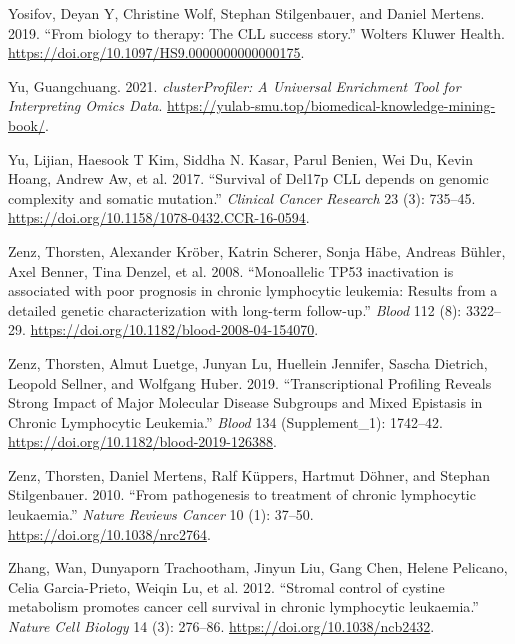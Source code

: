 \documentclass[11pt, a4paper, twosided]{book}
\newenvironment{CSLReferences}%
  {}%
  {\par}
\begin{document}
\begin{CSLReferences}{1}{0}
\leavevmode{}%
Yosifov, Deyan Y, Christine Wolf, Stephan Stilgenbauer, and Daniel Mertens. 2019. {``{From biology to therapy: The CLL success story}.''} Wolters Kluwer Health. \url{https://doi.org/10.1097/HS9.0000000000000175}.

\leavevmode{}%
Yu, Guangchuang. 2021. \emph{clusterProfiler: A Universal Enrichment Tool for Interpreting Omics Data}. \url{https://yulab-smu.top/biomedical-knowledge-mining-book/}.

\leavevmode{}%
Yu, Lijian, Haesook T Kim, Siddha N. Kasar, Parul Benien, Wei Du, Kevin Hoang, Andrew Aw, et al. 2017. {``{Survival of Del17p CLL depends on genomic complexity and somatic mutation}.''} \emph{Clinical Cancer Research} 23 (3): 735--45. \url{https://doi.org/10.1158/1078-0432.CCR-16-0594}.

\leavevmode{}%
Zenz, Thorsten, Alexander Kröber, Katrin Scherer, Sonja Häbe, Andreas Bühler, Axel Benner, Tina Denzel, et al. 2008. {``{Monoallelic TP53 inactivation is associated with poor prognosis in chronic lymphocytic leukemia: Results from a detailed genetic characterization with long-term follow-up}.''} \emph{Blood} 112 (8): 3322--29. \url{https://doi.org/10.1182/blood-2008-04-154070}.

\leavevmode{}%
Zenz, Thorsten, Almut Luetge, Junyan Lu, Huellein Jennifer, Sascha Dietrich, Leopold Sellner, and Wolfgang Huber. 2019. {``{Transcriptional Profiling Reveals Strong Impact of Major Molecular Disease Subgroups and Mixed Epistasis in Chronic Lymphocytic Leukemia}.''} \emph{Blood} 134 (Supplement\_1): 1742--42. \url{https://doi.org/10.1182/blood-2019-126388}.

\leavevmode{}%
Zenz, Thorsten, Daniel Mertens, Ralf Küppers, Hartmut Döhner, and Stephan Stilgenbauer. 2010. {``{From pathogenesis to treatment of chronic lymphocytic leukaemia}.''} \emph{Nature Reviews Cancer} 10 (1): 37--50. \url{https://doi.org/10.1038/nrc2764}.

\leavevmode{}%
Zhang, Wan, Dunyaporn Trachootham, Jinyun Liu, Gang Chen, Helene Pelicano, Celia Garcia-Prieto, Weiqin Lu, et al. 2012. {``{Stromal control of cystine metabolism promotes cancer cell survival in chronic lymphocytic leukaemia}.''} \emph{Nature Cell Biology} 14 (3): 276--86. \url{https://doi.org/10.1038/ncb2432}.


\end{CSLReferences}
\end{document}
